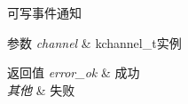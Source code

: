 可写事件通知 


\begin{DoxyParams}{参数}
{\em channel} & kchannel\+\_\+t实例 \\
\hline
\end{DoxyParams}

\begin{DoxyRetVals}{返回值}
{\em error\+\_\+ok} & 成功 \\
\hline
{\em 其他} & 失败 \\
\hline
\end{DoxyRetVals}
